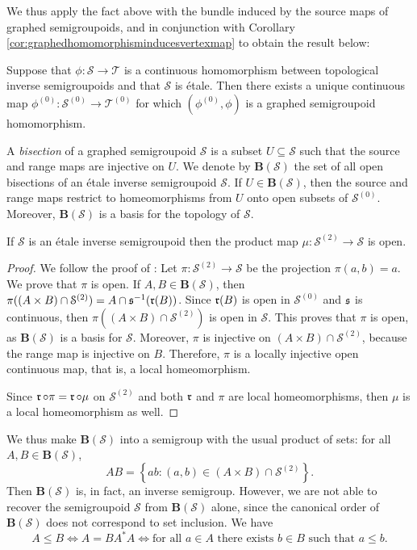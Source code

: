 We thus apply the fact above with the bundle induced by the source maps of graphed semigroupoids, and in conjunction with Corollary \ref{cor:graphedhomomorphisminducesvertexmap} to obtain the result below:

\begin{corollary}
Suppose that $\phi\colon\mathcal{S}\to\mathcal{T}$ is a continuous homomorphism between topological inverse semigroupoids and that $\mathcal{S}$ is étale. Then there exists a unique continuous map $\phi^{(0)}\colon\mathcal{S}^{(0)}\to\mathcal{T}^{(0)}$ for which $(\phi^{(0)},\phi)$ is a graphed semigroupoid homomorphism.
\end{corollary}

A \emph{bisection} of a graphed semigroupoid $\mathcal{S}$ is a subset $U\subseteq\mathcal{S}$ such that the source and range maps are injective on $U$. We denote by $\mathbf{B}(\mathcal{S})$ the set of all open bisections of an étale inverse semigroupoid $\mathcal{S}$. If $U\in\mathbf{B}(\mathcal{S})$, then the source and range maps restrict to homeomorphisms from $U$ onto open subsets of $\mathcal{S}^{(0)}$. Moreover, $\mathbf{B}(\mathcal{S})$ is a basis for the topology of $\mathcal{S}$.

\begin{proposition}\label{prop:productmapisopen}
If $\mathcal{S}$ is an étale inverse semigroupoid then the product map $\mu\colon\mathcal{S}^{(2)}\to\mathcal{S}$ is open.
\end{proposition}
\begin{proof}
We follow the proof of \cite[1.3.11]{cordeirothesis}: Let $\pi\colon \mathcal{S}^{(2)}\to\mathcal{S}$ be the projection $\pi(a,b)=a$. We prove that $\pi$ is open. If $A,B\in\mathbf{B}(\mathcal{S})$, then $\pi((A\times B)\cap \mathcal{S}^{(2)})=A\cap \operatorname{\mathfrak{s}}^{-1}(\operatorname{\mathfrak{r}}(B))$. Since $\operatorname{\mathfrak{r}}(B)$ is open in $\mathcal{S}^{(0)}$ and $\operatorname{\mathfrak{s}}$ is continuous, then $\pi((A\times B)\cap \mathcal{S}^{(2)})$ is open in $\mathcal{S}$. This proves that $\pi$ is open, as $\mathbf{B}(\mathcal{S})$ is a basis for $\mathcal{S}$. Moreover, $\pi$ is injective on $(A\times B)\cap\mathcal{S}^{(2)}$, because the range map is injective on $B$. Therefore, $\pi$ is a locally injective open continuous map, that is, a local homeomorphism.

Since $\operatorname{\mathfrak{r}}\circ\pi=\operatorname{\mathfrak{r}}\circ\mu$ on $\mathcal{S}^{(2)}$ and both $\operatorname{\mathfrak{r}}$ and $\pi$ are local homeomorphisms, then $\mu$ is a local homeomorphism as well.\qedhere
\end{proof}

We thus make $\mathbf{B}(\mathcal{S})$ into a semigroup with the usual product of sets: for all $A,B\in\mathbf{B}(\mathcal{S})$,
\[AB=\left\{ab:(a,b)\in (A\times B)\cap \mathcal{S}^{(2)}\right\}.\]
Then $\mathbf{B}(\mathcal{S})$ is, in fact, an inverse semigroup. However, we are not able to recover the semigroupoid $\mathcal{S}$ from $\mathbf{B}(\mathcal{S})$ alone, since the canonical order of $\mathbf{B}(\mathcal{S})$ does not correspond to set inclusion. We have
\[A\leq B\iff A=BA^*A\iff\text{for all }a\in A\text{ there exists }b\in B\text{ such that }a\leq b.\]

